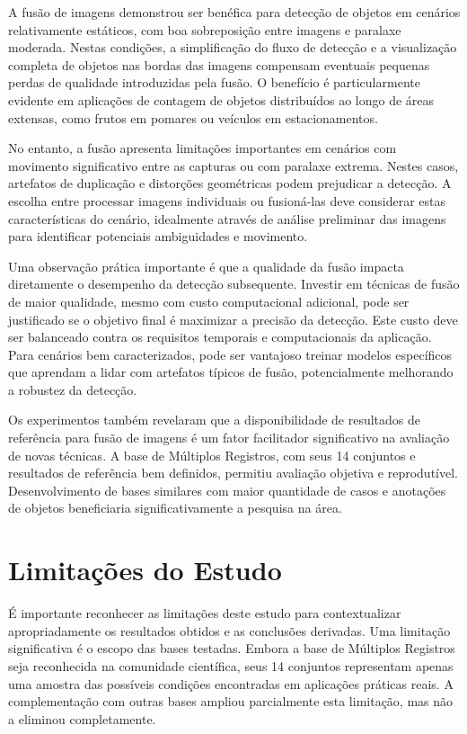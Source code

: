 A fusão de imagens demonstrou ser benéfica para detecção de objetos em cenários relativamente estáticos, com boa sobreposição entre imagens e paralaxe moderada. Nestas condições, a simplificação do fluxo de detecção e a visualização completa de objetos nas bordas das imagens compensam eventuais pequenas perdas de qualidade introduzidas pela fusão. O benefício é particularmente evidente em aplicações de contagem de objetos distribuídos ao longo de áreas extensas, como frutos em pomares ou veículos em estacionamentos.

No entanto, a fusão apresenta limitações importantes em cenários com movimento significativo entre as capturas ou com paralaxe extrema. Nestes casos, artefatos de duplicação e distorções geométricas podem prejudicar a detecção. A escolha entre processar imagens individuais ou fusioná-las deve considerar estas características do cenário, idealmente através de análise preliminar das imagens para identificar potenciais ambiguidades e movimento.

Uma observação prática importante é que a qualidade da fusão impacta diretamente o desempenho da detecção subsequente. Investir em técnicas de fusão de maior qualidade, mesmo com custo computacional adicional, pode ser justificado se o objetivo final é maximizar a precisão da detecção. Este custo deve ser balanceado contra os requisitos temporais e computacionais da aplicação. Para cenários bem caracterizados, pode ser vantajoso treinar modelos específicos que aprendam a lidar com artefatos típicos de fusão, potencialmente melhorando a robustez da detecção.

Os experimentos também revelaram que a disponibilidade de resultados de referência para fusão de imagens é um fator facilitador significativo na avaliação de novas técnicas. A base de Múltiplos Registros, com seus 14 conjuntos e resultados de referência bem definidos, permitiu avaliação objetiva e reprodutível. Desenvolvimento de bases similares com maior quantidade de casos e anotações de objetos beneficiaria significativamente a pesquisa na área.

\section{Limitações do Estudo}

É importante reconhecer as limitações deste estudo para contextualizar apropriadamente os resultados obtidos e as conclusões derivadas. Uma limitação significativa é o escopo das bases testadas. Embora a base de Múltiplos Registros seja reconhecida na comunidade científica, seus 14 conjuntos representam apenas uma amostra das possíveis condições encontradas em aplicações práticas reais. A complementação com outras bases ampliou parcialmente esta limitação, mas não a eliminou completamente.

